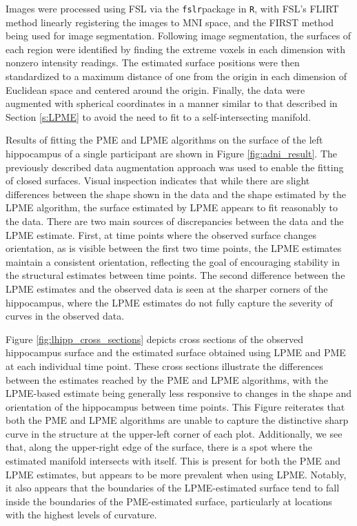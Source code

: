 \documentclass[11pt,reqno]{article}
\theoremstyle{definition}
\begin{document}
Images were processed using FSL via the \texttt{fslr}package in \texttt{R}, with FSL's FLIRT method linearly registering the images to MNI space, and the FIRST method being used for image segmentation. Following image segmentation, the surfaces of each region were identified by finding the extreme voxels in each dimension with nonzero intensity readings. The estimated surface positions were then standardized to a maximum distance of one from the origin in each dimension of Euclidean space and centered around the origin. Finally, the data were augmented with spherical coordinates in a manner similar to that described in Section \ref{s:LPME} to avoid the need to fit to a self-intersecting manifold.

Results of fitting the PME and LPME algorithms on the surface of the left hippocampus of a single participant are shown in Figure \ref{fig:adni_result}. The previously described data augmentation approach was used to enable the fitting of closed surfaces. Visual inspection indicates that while there are slight differences between the shape shown in the data and the shape estimated by the LPME algorithm, the surface estimated by LPME appears to fit reasonably to the data. There are two main sources of discrepancies between the data and the LPME estimate. First, at time points where the observed surface changes orientation, as is visible between the first two time points, the LPME estimates maintain a consistent orientation, reflecting the goal of encouraging stability in the structural estimates between time points. The second difference between the LPME estimates and the observed data is seen at the sharper corners of the hippocampus, where the LPME estimates do not fully capture the severity of curves in the observed data.

Figure \ref{fig:lhipp_cross_sections} depicts cross sections of the observed hippocampus surface and the estimated surface obtained using LPME and PME at each individual time point. These cross sections illustrate the differences between the estimates reached by the PME and LPME algorithms, with the LPME-based estimate being generally less responsive to changes in the shape and orientation of the hippocampus between time points. This Figure reiterates that both the PME and LPME algorithms are unable to capture the distinctive sharp curve in the structure at the upper-left corner of each plot. Additionally, we see that, along the upper-right edge of the surface, there is a spot where the estimated manifold intersects with itself. This is present for both the PME and LPME estimates, but appears to be more prevalent when using LPME. Notably, it also appears that the boundaries of the LPME-estimated surface tend to fall inside the boundaries of the PME-estimated surface, particularly at locations with the highest levels of curvature.
\end{document}
